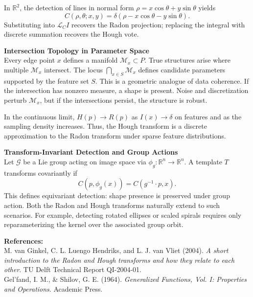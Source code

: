 \begin{technical}
In $\mathbb{R}^2$, the detection of lines in normal form $\rho = x\cos\theta + y\sin\theta$ yields
\[
C(\rho,\theta; x,y) = \delta(\rho - x\cos\theta - y\sin\theta).
\]
Substituting into $\mathcal{L}_C I$ recovers the Radon projection; replacing the integral with discrete summation recovers the Hough vote.

\textbf{Intersection Topology in Parameter Space}\\[0.5em]
Every edge point $x$ defines a manifold $\mathcal{M}_x \subset P$. True structures arise where multiple $\mathcal{M}_x$ intersect. The locus $\bigcap_{x \in S} \mathcal{M}_x$ defines candidate parameters supported by the feature set $S$. This is a geometric analogue of data coherence. If the intersection has nonzero measure, a shape is present. Noise and discretization perturb $\mathcal{M}_x$, but if the intersections persist, the structure is robust.

In the continuous limit, $H(p) \to R(p)$ as $I(x) \to \delta$ on features and as the sampling density increases. Thus, the Hough transform is a discrete approximation to the Radon transform under sparse feature distributions.

\textbf{Transform-Invariant Detection and Group Actions}\\[0.5em]
Let $\mathcal{G}$ be a Lie group acting on image space via $\phi_g: \mathbb{R}^n \to \mathbb{R}^n$. A template $T$ transforms covariantly if
\[
C(p, \phi_g(x)) = C(g^{-1} \cdot p, x).
\]
This defines equivariant detection: shape presence is preserved under group action. Both the Radon and Hough transforms naturally extend to such scenarios. For example, detecting rotated ellipses or scaled spirals requires only reparameterizing the kernel over the associated group orbit.

\vspace{0.5em}
\textbf{References:}\\[0.5em]
M. van Ginkel, C. L. Luengo Hendriks, and L. J. van Vliet (2004). \textit{A short introduction to the Radon and Hough transforms and how they relate to each other}. TU Delft Technical Report QI-2004-01.\\
Gel’fand, I. M., \& Shilov, G. E. (1964). \textit{Generalized Functions, Vol. I: Properties and Operations}. Academic Press.
\end{technical}
